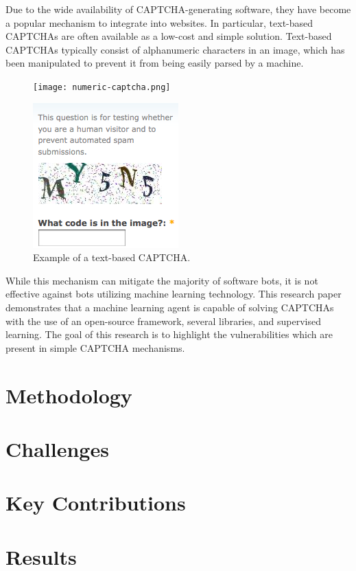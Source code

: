 \documentclass[11pt,conference]{IEEEtran}
\begin{document}
Due to the wide availability of CAPTCHA-generating software, they have become a popular
mechanism to integrate into websites. In particular, text-based CAPTCHAs are
often available as a low-cost and simple solution. Text-based CAPTCHAs
typically consist of alphanumeric characters in an image, which has been
manipulated to prevent it from being easily parsed by a machine. 

\begin{figure}[htbp]
    \centerline{\texttt{[image: numeric-captcha.png]}}
    \centerline{\includegraphics{alphanumeric-captcha.png}}
    \caption{Example of a text-based CAPTCHA.}
    \label{figure}
\end{figure}

While this mechanism can mitigate the majority of software bots, it is not
effective against bots utilizing machine learning technology. This research
paper demonstrates that a machine learning agent is capable of solving CAPTCHAs
with the use of an open-source framework, several
libraries, and supervised learning. The goal of this research is to
highlight the vulnerabilities which are present in simple CAPTCHA mechanisms.


\section{Methodology}

\section{Challenges}

\section{Key Contributions}

\section{Results}
\end{document}
